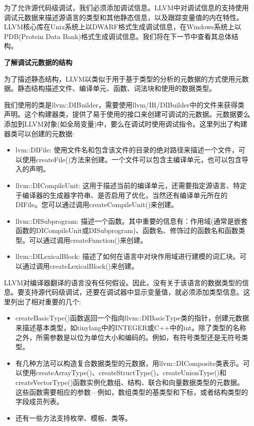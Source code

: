 
为了允许源代码级调试，我们必须添加调试信息。LLVM中对调试信息的支持使用调试元数据来描述源语言的类型和其他静态信息，以及跟踪变量值的内在特性。LLVM核心库在Unix系统上以DWARF格式生成调试信息，在Windows系统上以PDB(Protein Data Bank)格式生成调试信息。我们将在下一节中查看其总体结构。\par

\hspace*{\fill} \par %
\textbf{了解调试元数据的结构}

为了描述静态结构，LLVM以类似于用于基于类型的分析的元数据的方式使用元数据。静态结构描述文件、编译单元、函数、词法块和使用的数据类型。\par

我们使用的类是llvm::DIBuilder，需要使用llvm/IR/DIBuilder中的文件来获得类声明。这个构建器类，提供了易于使用的接口来创建可调试的元数据。元数据要么添加到LLVM对象(如全局变量)中，要么在调试时使用调试指令。这里列出了构建器类可以创建的元数据:\par

\begin{itemize}
\item lvm::DIFile: 使用文件名和包含该文件的目录的绝对路径来描述一个文件，可以使用createFile()方法来创建。一个文件可以包含主编译单元，也可以包含导入的声明。

\item llvm::DICompileUnit: 这用于描述当前的编译单元，还需要指定源语言、特定于编译器的生成器字符串、是否启用了优化，当然还有编译单元所在的DIFile。您可以通过调用createCompileUnit()来创建。

\item llvm::DISubprogram: 描述一个函数。其中重要的信息有：作用域(通常是嵌套函数的DICompileUnit或DISubprogram)、函数名、修饰过的函数名和函数类型。可以通过调用createFunction()来创建。

\item llvm::DILexicalBlock: 描述了如何在语言中对块作用域进行建模的词汇块。可以通过调用createLexicalBlock()来创建。

\end{itemize}

LLVM对编译器翻译的语言没有任何假设。因此，没有关于该语言的数据类型的信息。要支持源代码级调试，还要在调试器中显示变量值，就必须添加类型信息。这里列出了相对重要的几个:\par

\begin{itemize}
\item createBasicType()函数返回一个指向llvm::DIBasicType类的指针，创建元数据来描述基本类型，如tinylang中的INTEGER或C++中的int。除了类型的名称之外，所需参数是以位为单位大小和编码的。例如，有符号类型还是无符号类型。

\item 有几种方法可以构造复合数据类型的元数据，用llvm::DIComposite类表示。可以使用createArrayType()、createStructType()、createUnionType()和createVectorType()函数实例化数组、结构、联合和向量数据类型的元数据。这些函数需要相应的参数—例如，数组类型的基类型和下标，或者结构类型的字段成员列表。

\item 还有一些方法支持枚举、模板、类等。
\end{itemize}

